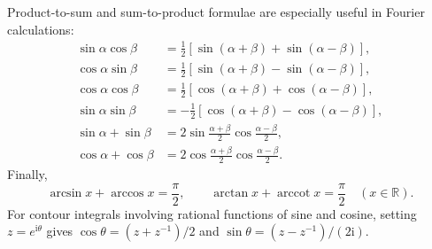 Product-to-sum and sum-to-product formulae are especially useful in Fourier calculations:
\begin{align}
\sin\alpha\cos\beta&=\frac12\left[\sin(\alpha+\beta)+\sin(\alpha-\beta)\right],\\
\cos\alpha\sin\beta&=\frac12\left[\sin(\alpha+\beta)-\sin(\alpha-\beta)\right],\\
\cos\alpha\cos\beta&=\frac12\left[\cos(\alpha+\beta)+\cos(\alpha-\beta)\right],\\
\sin\alpha\sin\beta&=-\frac12\left[\cos(\alpha+\beta)-\cos(\alpha-\beta)\right],\\
\sin\alpha+\sin\beta&=2\sin\frac{\alpha+\beta}{2}\cos\frac{\alpha-\beta}{2},\\
\cos\alpha+\cos\beta&=2\cos\frac{\alpha+\beta}{2}\cos\frac{\alpha-\beta}{2}.
\end{align}
Finally,
\begin{equation}
\arcsin x+\arccos x=\frac{\pi}{2},
\qquad
\arctan x+\operatorname{arccot}x=\frac{\pi}{2}\quad(x\in\mathbb{R}).
\end{equation}
For contour integrals involving rational functions of sine and cosine, setting $z=e^{\mathrm{i}\theta}$ gives $\cos\theta=(z+z^{-1})/2$ and $\sin\theta=(z-z^{-1})/(2\mathrm{i})$.
